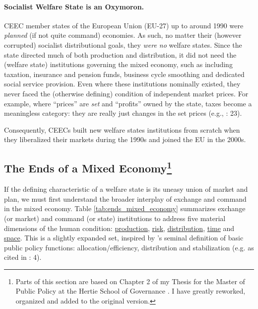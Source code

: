 \paragraph{Socialist Welfare State is an Oxymoron.} \gls{CEEC} member states of the European Union (EU-27) up to around 1990 were \emph{planned} (if not quite command) economies. As such, no matter their (however corrupted) socialist distributional goals, they \emph{were no} welfare states. Since the state directed much of both production and distribution, it did not need the (welfare state) institutions governing the mixed economy, such as including taxation, insurance and pension funds, business cycle smoothing and dedicated social service provision. Even where these institutions nominally existed, they never faced the (otherwise defining) condition of independent market prices. For example, where ``prices'' are \emph{set} and ``profits'' owned by the state, taxes become a meaningless category: they are really just changes in the set prices (e.g., \citealt{Bonker2006}: 23).

Consequently, \glspl{CEEC} built new welfare states institutions from scratch when they liberalized their markets during the 1990s and joined the EU in the 2000s. %

\subsection[Ends]{The Ends of a Mixed Economy\footnote{
	Parts of this section are based on Chapter 2 of my Thesis for the Master of Public Policy at the Hertie School of Governance \citep{Held2010a}. I have greatly reworked, organized and added to the original version.}} \label{sec:ends}
If the defining characteristic of a welfare state is its uneasy union of market and plan, we must first understand the broader interplay of exchange and command in the mixed economy. Table \ref{tab:ends_mixed_economy} summarizes exchange (or market) and command (or state) institutions to address five material dimensions of the human condition: \hyperref[sec:production]{production}, \hyperref[sec:risk]{risk}, \hyperref[sec:distribution]{distribution}, \hyperref[sec:time]{time} and \hyperref[sec:space]{space}. This is a slightly expanded set, inspired by \citeauthor{MusgThet1959}'s \citeyearpar{MusgThet1959} seminal definition of basic public policy functions: allocation/efficiency, distribution and stabilization (e.g. as cited in \citealt{Bordo2011}: 4).


